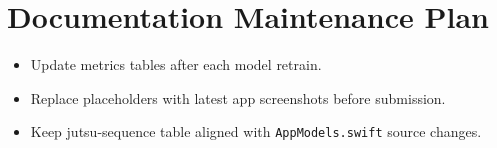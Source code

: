 \section{Documentation Maintenance Plan}
\begin{itemize}[leftmargin=2em]
\item Update metrics tables after each model retrain.
\item Replace placeholders with latest app screenshots before submission.
\item Keep jutsu-sequence table aligned with \texttt{AppModels.swift} source changes.
\end{itemize}
